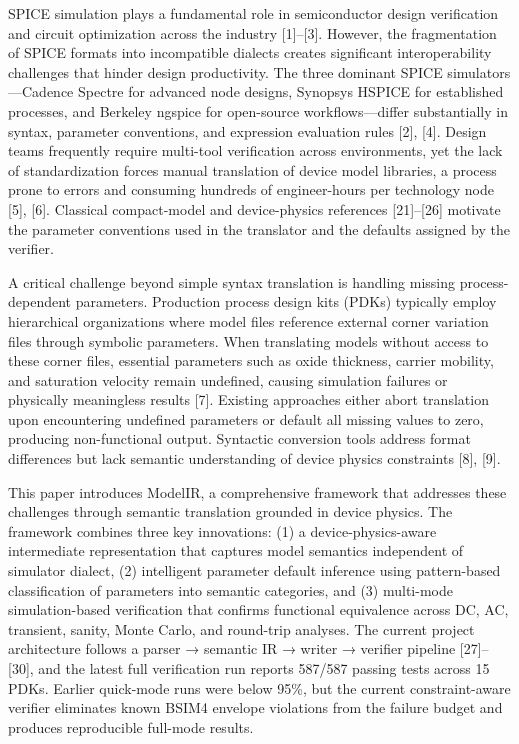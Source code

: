 \documentclass[10pt,twocolumn]{article}
\begin{document}
SPICE simulation plays a fundamental role in semiconductor design verification and circuit optimization across the industry [1]--[3]. However, the fragmentation of SPICE formats into incompatible dialects creates significant interoperability challenges that hinder design productivity. The three dominant SPICE simulators---Cadence Spectre for advanced node designs, Synopsys HSPICE for established processes, and Berkeley ngspice for open-source workflows---differ substantially in syntax, parameter conventions, and expression evaluation rules [2], [4]. Design teams frequently require multi-tool verification across environments, yet the lack of standardization forces manual translation of device model libraries, a process prone to errors and consuming hundreds of engineer-hours per technology node [5], [6]. Classical compact-model and device-physics references [21]--[26] motivate the parameter conventions used in the translator and the defaults assigned by the verifier.

A critical challenge beyond simple syntax translation is handling missing process-dependent parameters. Production process design kits (PDKs) typically employ hierarchical organizations where model files reference external corner variation files through symbolic parameters. When translating models without access to these corner files, essential parameters such as oxide thickness, carrier mobility, and saturation velocity remain undefined, causing simulation failures or physically meaningless results [7]. Existing approaches either abort translation upon encountering undefined parameters or default all missing values to zero, producing non-functional output. Syntactic conversion tools address format differences but lack semantic understanding of device physics constraints [8], [9].

This paper introduces ModelIR, a comprehensive framework that addresses these challenges through semantic translation grounded in device physics. The framework combines three key innovations: (1) a device-physics-aware intermediate representation that captures model semantics independent of simulator dialect, (2) intelligent parameter default inference using pattern-based classification of parameters into semantic categories, and (3) multi-mode simulation-based verification that confirms functional equivalence across DC, AC, transient, sanity, Monte Carlo, and round-trip analyses. The current project architecture follows a parser → semantic IR → writer → verifier pipeline [27]--[30], and the latest full verification run reports 587/587 passing tests across 15 PDKs. Earlier quick-mode runs were below 95\%, but the current constraint-aware verifier eliminates known BSIM4 envelope violations from the failure budget and produces reproducible full-mode results.
\end{document}
